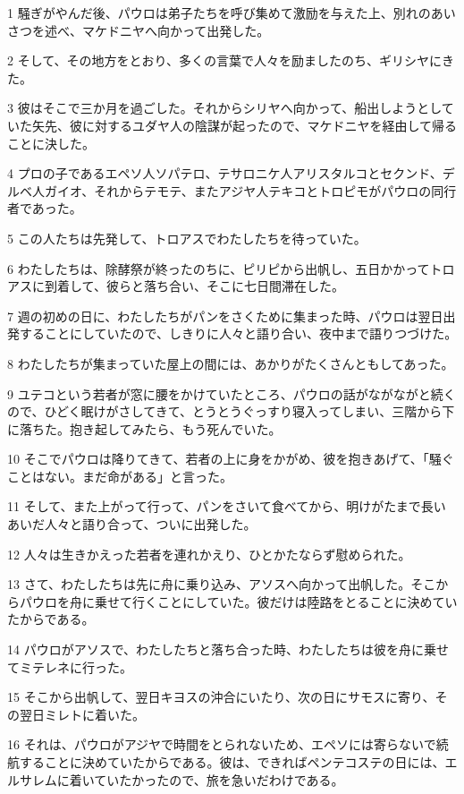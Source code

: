 \par 1 騒ぎがやんだ後、パウロは弟子たちを呼び集めて激励を与えた上、別れのあいさつを述べ、マケドニヤへ向かって出発した。
\par 2 そして、その地方をとおり、多くの言葉で人々を励ましたのち、ギリシヤにきた。
\par 3 彼はそこで三か月を過ごした。それからシリヤへ向かって、船出しようとしていた矢先、彼に対するユダヤ人の陰謀が起ったので、マケドニヤを経由して帰ることに決した。
\par 4 プロの子であるエペソ人ソパテロ、テサロニケ人アリスタルコとセクンド、デルベ人ガイオ、それからテモテ、またアジヤ人テキコとトロピモがパウロの同行者であった。
\par 5 この人たちは先発して、トロアスでわたしたちを待っていた。
\par 6 わたしたちは、除酵祭が終ったのちに、ピリピから出帆し、五日かかってトロアスに到着して、彼らと落ち合い、そこに七日間滞在した。
\par 7 週の初めの日に、わたしたちがパンをさくために集まった時、パウロは翌日出発することにしていたので、しきりに人々と語り合い、夜中まで語りつづけた。
\par 8 わたしたちが集まっていた屋上の間には、あかりがたくさんともしてあった。
\par 9 ユテコという若者が窓に腰をかけていたところ、パウロの話がながながと続くので、ひどく眠けがさしてきて、とうとうぐっすり寝入ってしまい、三階から下に落ちた。抱き起してみたら、もう死んでいた。
\par 10 そこでパウロは降りてきて、若者の上に身をかがめ、彼を抱きあげて、「騒ぐことはない。まだ命がある」と言った。
\par 11 そして、また上がって行って、パンをさいて食べてから、明けがたまで長いあいだ人々と語り合って、ついに出発した。
\par 12 人々は生きかえった若者を連れかえり、ひとかたならず慰められた。
\par 13 さて、わたしたちは先に舟に乗り込み、アソスへ向かって出帆した。そこからパウロを舟に乗せて行くことにしていた。彼だけは陸路をとることに決めていたからである。
\par 14 パウロがアソスで、わたしたちと落ち合った時、わたしたちは彼を舟に乗せてミテレネに行った。
\par 15 そこから出帆して、翌日キヨスの沖合にいたり、次の日にサモスに寄り、その翌日ミレトに着いた。
\par 16 それは、パウロがアジヤで時間をとられないため、エペソには寄らないで続航することに決めていたからである。彼は、できればペンテコステの日には、エルサレムに着いていたかったので、旅を急いだわけである。
